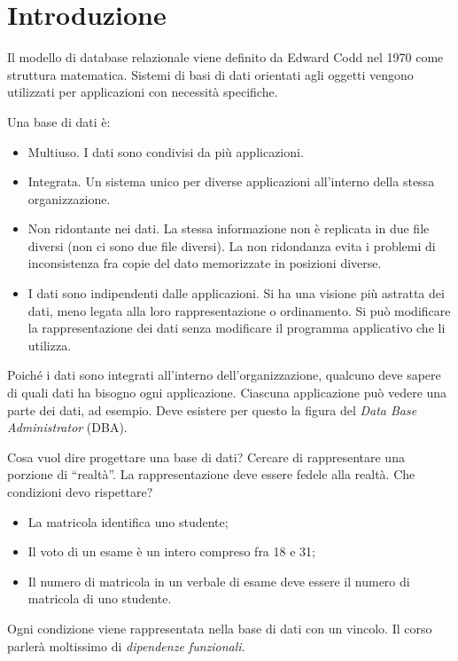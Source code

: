 \chapter{Introduzione}

Il modello di database relazionale viene definito da Edward Codd nel 1970 come struttura matematica. Sistemi di basi di dati orientati agli oggetti vengono utilizzati per applicazioni con necessit\`a specifiche.

Una base di dati \`e:
\begin{itemize}
    \item Multiuso. I dati sono condivisi da pi\`u applicazioni.
    \item Integrata. Un sistema unico per diverse applicazioni all'interno della stessa organizzazione.
    \item Non ridontante nei dati. La stessa informazione non \`e replicata in due file diversi (non ci sono due file diversi). La non ridondanza evita i problemi di inconsistenza fra copie del dato memorizzate in posizioni diverse.
    \item I dati sono indipendenti dalle applicazioni. Si ha una visione pi\`u astratta dei dati, meno legata alla loro rappresentazione o ordinamento. Si pu\`o modificare la rappresentazione dei dati senza modificare il programma applicativo che li utilizza.
\end{itemize}

Poich\'e i dati sono integrati all'interno dell'organizzazione, qualcuno deve sapere di quali dati ha bisogno ogni applicazione. Ciascuna applicazione pu\`o vedere una parte dei dati, ad esempio. Deve esistere per questo la figura del \emph{Data Base Administrator} (DBA).

Cosa vuol dire progettare una base di dati? Cercare di rappresentare una porzione di ``realt\`a''. La rappresentazione deve essere fedele alla realt\`a. Che condizioni devo rispettare?

\begin{itemize}
    \item La matricola identifica uno studente;
    \item Il voto di un esame \`e un intero compreso fra 18 e 31;
    \item Il numero di matricola in un verbale di esame deve essere il numero di matricola di uno studente.
\end{itemize}

Ogni condizione viene rappresentata nella base di dati con un vincolo. Il corso parler\`a moltissimo di \emph{dipendenze funzionali}.

